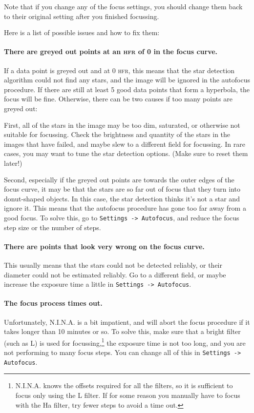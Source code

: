 \documentclass[a4paper, 11pt, fleqn]{memoir}
\begin{document}
Note that if you change any of the focus settings, you should change them back to their original setting after you finished focussing.

Here is a list of possible issues and how to fix them:

\paragraph*{There are greyed out points at an \textsc{hfr} of 0 in the focus curve.
}
If a data point is greyed out and at 0 \textsc{hfr}, this means that the star detection algorithm could not find any stars, and the image will be ignored in the autofocus procedure.
If there are still at least 5 good data points that form a hyperbola, the focus will be fine.
Otherwise, there can be two causes if too many points are greyed out:

First, all of the stars in the image may be too dim, saturated, or otherwise not suitable for focussing.
Check the brightness and quantity of the stars in the images that have failed, and maybe slew to a different field for focussing.
In rare cases, you may want to tune the star detection options.
(Make sure to reset them later!)

Second, especially if the greyed out points are towards the outer edges of the focus curve, it may be that the stars are so far out of focus that they turn into donut-shaped objects.
In this case, the star detection thinks it's not a star and ignore it.
This means that the autofocus procedure has gone too far away from a good focus.
To solve this, go to \texttt{Settings -> Autofocus}, and reduce the focus step size or the number of steps.

\paragraph*{There are points that look very wrong on the focus curve.}
This usually means that the stars could not be detected reliably, or their diameter could not be estimated reliably.
Go to a different field, or maybe increase the exposure time a little in \texttt{Settings -> Autofocus}.

\paragraph*{The focus process times out.}
Unfortunately, N.I.N.A.
is a bit impatient, and will abort the focus procedure if it takes longer than 10 minutes or so.
To solve this, make sure that a bright filter (such as L) is used for focussing,\footnote{N.I.N.A.
    knows the offsets required for all the filters, so it is sufficient to focus only using the L filter.
    If for some reason you manually have to focus with the Ha filter, try fewer steps to avoid a time out.
} the exposure time is not too long, and you are not performing to many focus steps.
You can change all of this in \texttt{Settings -> Autofocus}.
\end{document}
